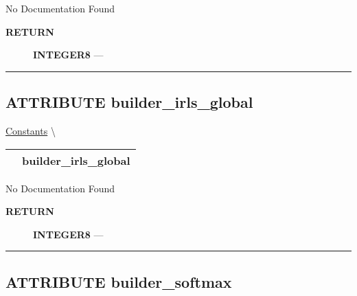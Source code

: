 \par





No Documentation Found








\par
\begin{description}
\item [\colorbox{tagtype}{\color{white} \textbf{\textsf{RETURN}}}] \textbf{INTEGER8} --- 
\end{description}




\rule{\linewidth}{0.5pt}
\subsection*{\textsf{\colorbox{headtoc}{\color{white} ATTRIBUTE}
builder\_irls\_global}}

\hypertarget{ecldoc:logisticregression.constants.builder_irls_global}{}
\hspace{0pt} \hyperlink{ecldoc:LogisticRegression.Constants}{Constants} \textbackslash 

{\renewcommand{\arraystretch}{1.5}
\begin{tabularx}{\textwidth}{|>{\raggedright\arraybackslash}l|X|}
\hline
\hspace{0pt}\mytexttt{\color{red} } & \textbf{builder\_irls\_global} \\
\hline
\end{tabularx}
}

\par





No Documentation Found








\par
\begin{description}
\item [\colorbox{tagtype}{\color{white} \textbf{\textsf{RETURN}}}] \textbf{INTEGER8} --- 
\end{description}




\rule{\linewidth}{0.5pt}
\subsection*{\textsf{\colorbox{headtoc}{\color{white} ATTRIBUTE}
builder\_softmax}}

